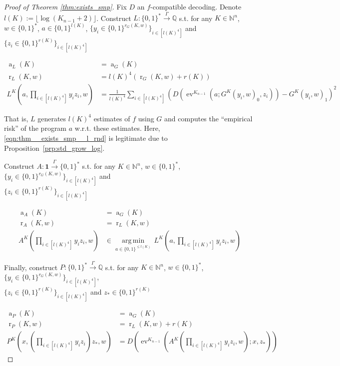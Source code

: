 \documentclass{article}
\numberwithin{equation}{section}
\theoremstyle{definition}
\theoremstyle{plain}
\newcommand{\Bool}{\{0,1\}}
\newcommand{\Words}{{\Bool^*}}
\DeclareMathOperator{\Ev}{ev}
\DeclareMathOperator{\R}{r}
\DeclareMathOperator{\A}{a}
\newcommand{\Argmin}[1]{\underset{#1}{\operatorname{arg\,min}}\,}
\newcommand{\Nats}{\mathbb{N}}
\newcommand{\Rats}{\mathbb{Q}}
\newcommand{\Floor}[1]{\lfloor #1 \rfloor}
\newcommand{\Scheme}{\xrightarrow{\Gamma}}
\begin{document}
\begin{proof}[Proof of Theorem \ref{thm:exists_smp}]

Fix ${D}$ an ${f}$-compatible decoding. Denote\\ ${l(K):=\Floor{\log (K_{n-1} + 2)}}$. Construct ${L: \Words \Scheme \Rats}$ s.t. for any ${K \in \Nats^n}$, $w \in \Words$, ${a \in \Bool^{l(K)}}$, ${\{y_i \in \Bool^{r_G(K,w)}\}_{i \in [l(K)^4]}}$ and ${\{z_i \in \Bool^{r(K)}\}_{i \in [l(K)^4]}}$

\begin{align}
\label{eqn:thm__exists_smp__l_adv}\A_L(K) &= \A_G(K) \\
\label{eqn:thm__exists_smp__l_rnd}\R_L(K,w) &= l(K)^4 (\R_G(K,w) + r(K)) \\
\label{eqn:thm__exists_smp__l_alg}L^K(a,\prod_{i \in [l(K)^4]}y_i z_i,w) &= \frac{1}{l(K)^4}\sum_{i \in [l(K)^4]}(D(\Ev^{K_{n-1}}(a;G^K(y_i,w)_0,z_i))-G^K(y_i,w)_1)^2 
\end{align}

That is, ${L}$ generates ${l(K)^4}$ estimates of ${f}$ using ${G}$ and computes the \enquote{empirical risk} of the program ${a}$ w.r.t. these estimates. Here, \ref{eqn:thm__exists_smp__l_rnd} is legitimate due to Proposition~\ref{prp:std_grow_log}. 

Construct ${A: \bm{1} \Scheme \Words}$ s.t. for any ${K \in \Nats^n}$, ${w \in \Words}$, ${\{y_i \in \Bool^{r_G(K,w)}\}_{i \in [l(K)^4]}}$ and\\ ${\{z_i \in \Bool^{r(K)}\}_{i \in [l(K)^4]}}$

\begin{align}
\label{eqn:thm__exists_smp__a_adv}\A_A(K) &= \A_G(K) \\
\label{eqn:thm__exists_smp__a_rnd}\R_A(K,w) &= \R_L(K,w) \\
\label{eqn:thm__exists_smp__a_alg}A^K(\prod_{i \in [l(K)^4]}y_i z_i,w) &\in \Argmin{a \in \Bool^{\leq l(K)}} L^K(a,\prod_{i \in [l(K)^4]}y_i z_i,w)
\end{align}

Finally, construct ${P: \Words \Scheme \Rats}$ s.t. for any ${K \in \Nats^n}$, ${w \in \Words}$, ${\{y_i \in \Bool^{r_G(K,w)}\}_{i \in [l(K)^4]}}$,\\ ${\{z_i \in \Bool^{r(K)}\}_{i \in [l(K)^4]}}$ and ${z_* \in \Bool^{r(K)}}$

\begin{align}
\label{eqn:thm__exists_smp__p_adv}\A_P(K) &= \A_G(K) \\
\label{eqn:thm__exists_smp__p_rnd}\R_P(K,w) &= \R_L(K,w) + r(K) \\
\label{eqn:thm__exists_smp__p_alg}P^K(x,(\prod_{i \in [l(K)^4]}y_i z_i)z_{*},w) &= D(\Ev^{K_{n-1}}(A^K(\prod_{i \in [l(K)^4]}y_i z_i,w);x,z_{*}))
\end{align}


\end{proof}
\end{document}
